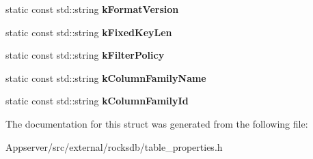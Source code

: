 \begin{DoxyCompactItemize}
\item 
static const std\+::string {\bfseries k\+Format\+Version}\hypertarget{structrocksdb_1_1TablePropertiesNames_a584cfc70030e72d43494fd14516ef05d}{}\label{structrocksdb_1_1TablePropertiesNames_a584cfc70030e72d43494fd14516ef05d}

\item 
static const std\+::string {\bfseries k\+Fixed\+Key\+Len}\hypertarget{structrocksdb_1_1TablePropertiesNames_a2ddd7ed786c090abf638a7aa275154b7}{}\label{structrocksdb_1_1TablePropertiesNames_a2ddd7ed786c090abf638a7aa275154b7}

\item 
static const std\+::string {\bfseries k\+Filter\+Policy}\hypertarget{structrocksdb_1_1TablePropertiesNames_aea89100707001e694d8cfffb15403b48}{}\label{structrocksdb_1_1TablePropertiesNames_aea89100707001e694d8cfffb15403b48}

\item 
static const std\+::string {\bfseries k\+Column\+Family\+Name}\hypertarget{structrocksdb_1_1TablePropertiesNames_a16f19f879ea8580dd9b9014bdf803a8b}{}\label{structrocksdb_1_1TablePropertiesNames_a16f19f879ea8580dd9b9014bdf803a8b}

\item 
static const std\+::string {\bfseries k\+Column\+Family\+Id}\hypertarget{structrocksdb_1_1TablePropertiesNames_a35538bd15bb50af9633dc01cba85dd5f}{}\label{structrocksdb_1_1TablePropertiesNames_a35538bd15bb50af9633dc01cba85dd5f}

\end{DoxyCompactItemize}


The documentation for this struct was generated from the following file\+:\begin{DoxyCompactItemize}
\item 
Appserver/src/external/rocksdb/table\+\_\+properties.\+h\end{DoxyCompactItemize}
